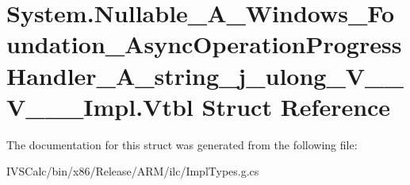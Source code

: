\hypertarget{struct_system_1_1_nullable___a___windows___foundation___async_operation_progress_handler___a__st106848128dfd05be017bf8e2513d1a19}{}\section{System.\+Nullable\+\_\+\+A\+\_\+\+Windows\+\_\+\+Foundation\+\_\+\+Async\+Operation\+Progress\+Handler\+\_\+\+A\+\_\+string\+\_\+j\+\_\+ulong\+\_\+\+V\+\_\+\+\_\+\+V\+\_\+\+\_\+\+\_\+\+Impl.\+Vtbl Struct Reference}
\label{struct_system_1_1_nullable___a___windows___foundation___async_operation_progress_handler___a__st106848128dfd05be017bf8e2513d1a19}


The documentation for this struct was generated from the following file\+:\begin{DoxyCompactItemize}
\item 
I\+V\+S\+Calc/bin/x86/\+Release/\+A\+R\+M/ilc/Impl\+Types.\+g.\+cs\end{DoxyCompactItemize}
